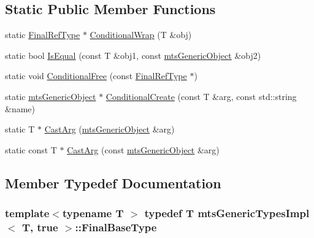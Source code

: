 \subsection*{Static Public Member Functions}
\begin{DoxyCompactItemize}
\item 
static \hyperlink{classmts_generic_types_impl_3_01_t_00_01true_01_4_a76ded5912b20f9057bf7835ca04cfb89}{Final\+Ref\+Type} $\ast$ \hyperlink{classmts_generic_types_impl_3_01_t_00_01true_01_4_aef2b40c8a72a6fbe7aecc055f259c5c6}{Conditional\+Wrap} (T \&obj)
\item 
static bool \hyperlink{classmts_generic_types_impl_3_01_t_00_01true_01_4_a8b7cc64482c685ad2be96d0906bc18d2}{Is\+Equal} (const T \&obj1, const \hyperlink{classmts_generic_object}{mts\+Generic\+Object} \&obj2)
\item 
static void \hyperlink{classmts_generic_types_impl_3_01_t_00_01true_01_4_a4eb2f1e60e027075ca90cf7a23a5f3fc}{Conditional\+Free} (const \hyperlink{classmts_generic_types_impl_3_01_t_00_01true_01_4_a76ded5912b20f9057bf7835ca04cfb89}{Final\+Ref\+Type} $\ast$)
\item 
static \hyperlink{classmts_generic_object}{mts\+Generic\+Object} $\ast$ \hyperlink{classmts_generic_types_impl_3_01_t_00_01true_01_4_a289a718404559aac15f4952f407e9149}{Conditional\+Create} (const T \&arg, const std\+::string \&name)
\item 
static T $\ast$ \hyperlink{classmts_generic_types_impl_3_01_t_00_01true_01_4_ae9a9bd60b09ed13ef953e329863f382b}{Cast\+Arg} (\hyperlink{classmts_generic_object}{mts\+Generic\+Object} \&arg)
\item 
static const T $\ast$ \hyperlink{classmts_generic_types_impl_3_01_t_00_01true_01_4_a790b68e26f2a7aec9fde15cbf2372eed}{Cast\+Arg} (const \hyperlink{classmts_generic_object}{mts\+Generic\+Object} \&arg)
\end{DoxyCompactItemize}


\subsection{Member Typedef Documentation}
\hypertarget{classmts_generic_types_impl_3_01_t_00_01true_01_4_a3d735609254b24b78bc37157a3d9ce35}{}
\subsubsection[{Final\+Base\+Type}]{\setlength{\rightskip}{0pt plus 5cm}template$<$typename T $>$ typedef T {\bf mts\+Generic\+Types\+Impl}$<$ T, true $>$\+::{\bf Final\+Base\+Type}}\label{classmts_generic_types_impl_3_01_t_00_01true_01_4_a3d735609254b24b78bc37157a3d9ce35}
\hypertarget{classmts_generic_types_impl_3_01_t_00_01true_01_4_a76ded5912b20f9057bf7835ca04cfb89}{}
